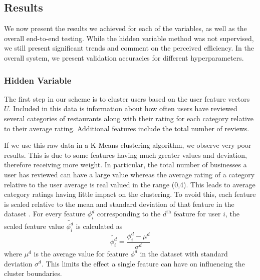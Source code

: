 \documentclass[11pt]{article}
\begin{document}
\subsection{Results}
We now present the results we achieved for each of the variables, as well as the overall end-to-end testing. While the hidden variable method was not supervised, we still present significant trends and comment on the perceived efficiency. In the overall system, we present validation accuracies for different hyperparameters.

\subsubsection{Hidden Variable}
The first step in our scheme is to cluster users based on the user feature vectors $U$. Included in this data is information about how often users have reviewed several categories of restaurants along with their rating for each category relative to their average rating. Additional features include the total number of reviews. 
 
If we use this raw data in a K-Means clustering algorithm, we observe very poor results. This is due to some features having much greater values and deviation, therefore receiving more weight. In particular, the total number of businesses a user has reviewed can have a large value whereas the average rating of a category relative to the user average is real valued in the range (0,4). This leads to average category ratings having little impact on the clustering. To avoid this, each feature is scaled relative to the mean and standard deviation of that feature in the dataset \cite{kmeans}. For every feature $\phi^d_i$ corresponding to the $d^{\text{th}}$ feature for user $i$, the scaled feature value $\tilde{\phi^d_i}$ is calculated as
 \begin{equation}
\tilde{\phi^d_i} = \frac{\phi^d_i - \mu^d}{\sigma^d}
 \end{equation}
 where $\mu^d$ is the average value for feature $\phi^d$ in the dataset with standard deviation $\sigma^d$. This limits the effect a single feature can have on influencing the cluster boundaries.
 
\end{document}
